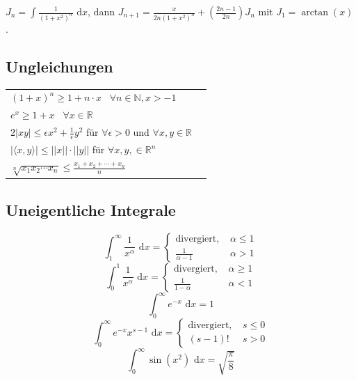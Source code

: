 \documentclass[a4paper,10pt]{article}
\def\dx{\text{ d}x}
\begin{document}
$J_n = \int \frac{1}{(1 + x^2)^n} \dx$, dann $J_{n+1} = \frac{x}{2n(1 + x^2)^n} + (\frac{2n - 1}{2n})J_n$ mit $J_1 = \arctan(x)$.

\subsection{Ungleichungen}
\begin{center}
  \begin{tabularx}{\linewidth}{>{\centering\arraybackslash}X>{\centering\arraybackslash}X}
    $(1+x)^n \geq 1+ n\cdot x$ \, $\forall n\in \mathbb{N}, x > -1$\\
    $e^x \geq 1 + x$ \, $\forall x\in \mathbb{R}$\\
    $2|xy| \leq \epsilon x^2 + \frac{1}{\epsilon} y^2$ für $\forall \epsilon > 0$ und $\forall x,y \in \mathbb{R}$\\
    $|\langle x,y \rangle| \leq ||x|| \cdot ||y||$ für $\forall x,y, \in \mathbb{R}^n$\\
    $\sqrt[n]{x_1 x_2 \cdots x_n} \leq \frac{x_1 + x_2 + \cdots + x_n}{n}$
  \end{tabularx}
\end{center}

\subsection{Uneigentliche Integrale}
$$\int_1^\infty \frac{1}{x^\alpha} \dx = \begin{cases}
  \text{divergiert, } & \alpha \leq 1\\
  \frac{1}{\alpha - 1} & \alpha > 1
\end{cases}$$
$$\int_0^1 \frac{1}{x^\alpha} \dx = \begin{cases}
  \text{divergiert, } & \alpha \geq 1\\
  \frac{1}{1- \alpha} & \alpha < 1
\end{cases}$$
$$\int_0^\infty e^{-x} \dx = 1$$
$$\int_0^\infty e^{-x}x^{s-1} \dx = \begin{cases}
  \text{divergiert, } & s \leq 0\\
  (s-1)! & s > 0
\end{cases}$$
$$\int_0^\infty \sin(x^2) \dx = \sqrt{\frac{\pi}{8}}$$
\end{document}
